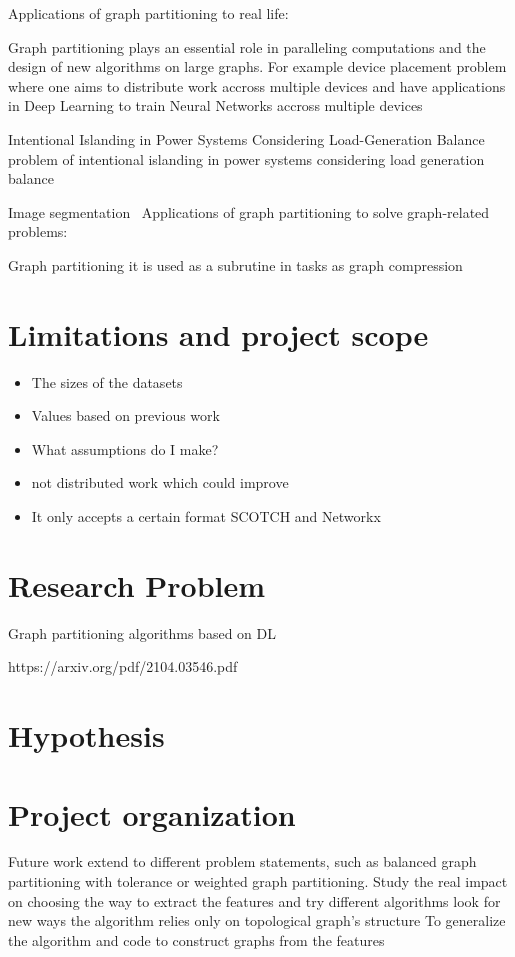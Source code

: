 Applications of graph partitioning to real life:

Graph partitioning plays an essential role in paralleling computations and the design of new algorithms on large graphs. For example device placement problem where one aims to distribute work accross multiple devices and have applications in Deep Learning to train Neural Networks accross multiple devices \cite{deviceplacement} 

Intentional Islanding in Power Systems
Considering Load-Generation Balance
problem of intentional islanding in power systems considering load generation balance ~ \cite{islanding}

Image segmentation~\cite{imagesegmentation}
Applications of graph partitioning to solve graph-related problems:

Graph partitioning it is used as a subrutine in tasks as graph compression ~ \cite{compressgraphs}
\section{Limitations and project scope}
\begin{itemize}
    \item The sizes of the datasets
    \item Values based on previous work
    \item What assumptions do I make?
    \item not distributed work which could improve
    \item It only accepts a certain format SCOTCH and Networkx
\end{itemize}

\section{Research Problem}
Graph partitioning algorithms based on DL

https://arxiv.org/pdf/2104.03546.pdf
\section{Hypothesis}

\section{Project organization}

Future work
extend to different problem statements, such as balanced graph partitioning with tolerance or weighted graph partitioning.
Study the real impact on choosing the way to extract the features and try different algorithms
look for new ways the algorithm relies only on topological graph's structure
To generalize the algorithm and code to construct graphs from the features
